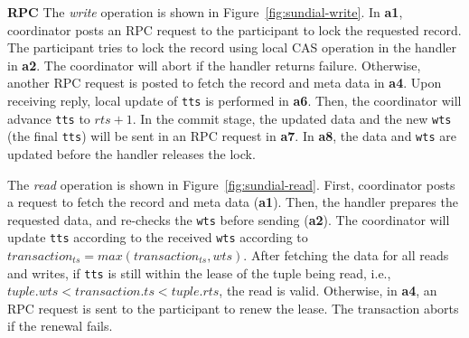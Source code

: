 

{\bf RPC}
The {\em write} operation is shown in Figure~\ref{fig:sundial-write}. In \step \textbf{a1}, coordinator posts an RPC request to the participant to lock the requested record. The participant tries to lock the record using local CAS operation in the handler in \step \textbf{a2}. The coordinator will abort if the handler returns failure. Otherwise, another RPC request is posted to fetch the record and meta data in \step \textbf{a4}. Upon receiving reply, local update of \texttt{tts} is performed in \step \textbf{a6}. Then, 
the coordinator will advance \texttt{tts} to $rts + 1$. In the commit stage, the updated data and the new \texttt{wts} (the final \texttt{tts}) will be sent in an RPC request in \step \textbf{a7}. In \step \textbf{a8}, the data and \texttt{wts} are updated before the handler releases the lock. 

The {\em read} operation is shown in Figure~\ref{fig:sundial-read}. First, 
coordinator posts a request to fetch the record and meta data 
(\step \textbf{a1}). 
Then, the handler prepares the requested data, 
and re-checks the \texttt{wts} before sending 
(\step \textbf{a2}). 
The coordinator will update \texttt{tts} 
according to the received \texttt{wts} 
according to 
$transaction_{ts} = max(transaction_{ts}, wts)$. After fetching the data for all reads and writes, 
if \texttt{tts} is still within the lease of the tuple being read, i.e., $tuple.wts < transaction.ts < tuple.rts$, the read is valid. 
Otherwise, in \step \textbf{a4}, an RPC request 
is sent to the participant to renew the lease. The transaction aborts if the renewal fails. %

